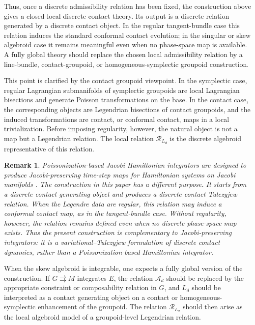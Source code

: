 \documentclass[11pt]{article}
\newtheorem{remark}[theorem]{Remark}
\newcommand{\mc}[1]{\mathcal{#1}}
\begin{document}
Thus, once a discrete admissibility relation has been fixed, the construction
above gives a closed local discrete contact theory. Its output is a discrete relation generated by a discrete contact object. In the regular tangent-bundle case this relation induces the standard conformal contact evolution; in the singular or skew algebroid case it remains meaningful even when no phase-space map is available. A fully global theory should replace the chosen local admissibility relation by a line-bundle, contact-groupoid, or homogeneous-symplectic groupoid construction.

This point is clarified by the contact groupoid viewpoint. In the symplectic
case, regular Lagrangian submanifolds of symplectic groupoids are local
Lagrangian bisections and generate Poisson transformations on the base. In the
contact case, the corresponding objects are Legendrian bisections of contact
groupoids, and the induced transformations are contact, or conformal contact,
maps in a local trivialization. Before imposing regularity, however, the natural
object is not a map but a Legendrian relation. The local relation
\(\mc R_{L_d}\) is the discrete algebroid representative of this relation.


\begin{remark}
Poissonization-based Jacobi Hamiltonian integrators are designed to produce
Jacobi-preserving time-step maps for Hamiltonian systems on Jacobi manifolds
\cite{AraujoOliveiraMestre2026}. The construction in this paper has a
different purpose. It starts from a discrete contact generating object and
produces a discrete contact Tulczyjew relation. When the Legendre data are
regular, this relation may induce a conformal contact map, as in the
tangent-bundle case. Without regularity, however, the relation remains defined
even when no discrete phase-space map exists. Thus the present construction is
complementary to Jacobi-preserving integrators: it is a variational--Tulczyjew
formulation of discrete contact dynamics, rather than a Poissonization-based
Hamiltonian integrator.
\end{remark}

When the skew algebroid is integrable, one expects a fully global version of
the construction. If \(G\rightrightarrows M\) integrates \(E\), the relation
\(\mc A_d\) should be replaced by the appropriate constraint or composability
relation in \(G\), and \(L_d\) should be interpreted as a contact generating
object on a contact or homogeneous-symplectic enhancement of the groupoid. The
relation \(\mc R_{L_d}\) should then arise as the local algebroid model of a
groupoid-level Legendrian relation.
\end{document}

